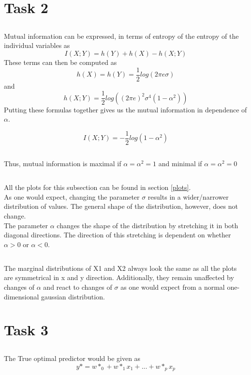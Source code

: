 \documentclass{article}
\begin{document}
\section{Task 2}
\subsection{}
Mutual information can be expressed, in terms of entropy of the entropy of the individual variables as
$$I(X;Y)=h(Y)+h(X)-h(X;Y)$$
These terms can then be computed as
$$h(X)=h(Y)=\frac{1}{2}log(2\pi e\sigma )$$
and
$$h(X;Y)=\frac{1}{2}log((2\pi e)^2\sigma ^4(1-\alpha ^2))$$
Putting these formulas together gives us the mutual information in dependence of $\alpha$.

$$I(X;Y)=-\frac{1}{2}log(1-\alpha^2)$$

\subsection{}
Thus, mutual information is maximal if $\alpha =\alpha ^2=1$ and minimal if $\alpha =\alpha ^2=0$

\subsection{}
All the plots for this subsection can be found in section \ref{plots}.\\
As one would expect, changing the parameter $\sigma$ results in a wider/narrower distribution of values. The general shape of the distribution, however, does not change.\\
The parameter $\alpha$ changes the shape of the distribution by stretching it in both diagonal directions. The direction of this stretching is dependent on whether $\alpha > 0$ or $\alpha < 0$.

\subsection{}
The marginal distributions of X1 and X2 always look the same as all the plots are symmetrical in x and y direction. Additionally, they remain unaffected by changes of $\alpha$ and react to changes of $\sigma$ as one would expect from a normal one-dimensional gaussian distribution.

\section{Task 3}
\subsection{}
The True optimal predictor would be given as $$y*=w*_0+w*_1x_1+...+w*_px_p$$
\end{document}

